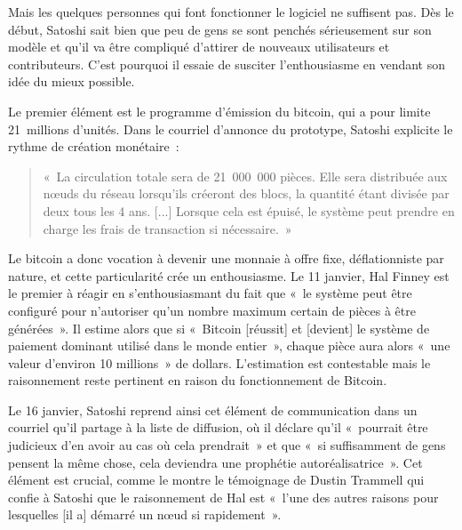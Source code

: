 

Mais les quelques personnes qui font fonctionner le logiciel ne suffisent pas. Dès le début, Satoshi sait bien que peu de gens se sont penchés sérieusement sur son modèle et qu'il va être compliqué d'attirer de nouveaux utilisateurs et contributeurs. C'est pourquoi il essaie de susciter l'enthousiasme en vendant son idée du mieux possible.


Le premier élément est le programme d'émission du bitcoin, qui a pour limite 21~millions d'unités. Dans le courriel d'annonce du prototype, Satoshi explicite le rythme de création monétaire~:

\begin{quote}
«~La circulation totale sera de 21~000~000 pièces. Elle sera distribuée aux nœuds du réseau lorsqu'ils créeront des blocs, la quantité étant divisée par deux tous les 4 ans. [...] Lorsque cela est épuisé, le système peut prendre en charge les frais de transaction si nécessaire.~»
\end{quote}

Le bitcoin a donc vocation à devenir une monnaie à offre fixe, déflationniste par nature, et cette particularité crée un enthousiasme. Le 11 janvier, Hal Finney est le premier à réagir en s'enthousiasmant du fait que «~le système peut être configuré pour n'autoriser qu'un nombre maximum certain de pièces à être générées~». Il estime alors que si «~Bitcoin [réussit] et [devient] le système de paiement dominant utilisé dans le monde entier~», chaque pièce aura alors «~une valeur d'environ 10 millions~» de dollars. L'estimation est contestable mais le raisonnement reste pertinent en raison du fonctionnement de Bitcoin.

Le 16 janvier, Satoshi reprend ainsi cet élément de communication dans un courriel qu'il partage à la liste de diffusion, où il déclare qu'il «~pourrait être judicieux d'en avoir au cas où cela prendrait~» et que «~si suffisamment de gens pensent la même chose, cela deviendra une prophétie autoréalisatrice~». Cet élément est crucial, comme le montre le témoignage de Dustin Trammell qui confie à Satoshi que le raisonnement de Hal est «~l'une des autres raisons pour lesquelles [il a] démarré un nœud si rapidement~».


